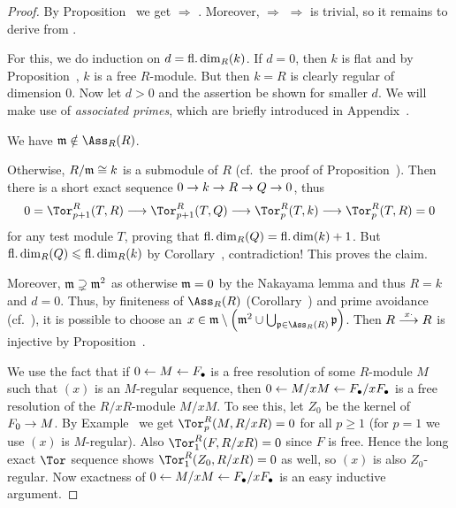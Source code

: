 \documentclass[a4paper,parskip=half,numbers=enddot, DIV=12]{scrreprt}
\renewcommand{\geq}{\geqslant}
\renewcommand{\leq}{\leqslant}
\begin{document}
\begin{proof}
	By Proposition~ we get  $\Rightarrow$ . Moreover,  $\Rightarrow$  $\Rightarrow$  is trivial, so it remains to derive  from .
	
	For this, we do induction on $d=\operatorname{fl.dim}_R(k)$. If $d=0$, then $k$ is flat and by Proposition~, $k$ is a free $R$-module. But then $k=R$ is clearly regular of dimension $0$. Now let $d>0$ and the assertion be shown for smaller $d$. We will make use of \emph{associated primes}, which are briefly introduced in Appendix~. 
	\begin{claim}
		We have $\mm\notin\Ass_R(R)$.
	\end{claim}
	Otherwise, $R/\mathfrak{m}\cong k$ is a submodule of $R$ (cf.\ the proof of Proposition~). Then there is a short exact sequence $0\morphism k\morphism R\morphism Q\morphism 0$, thus
	\begin{align*}
		0=\Tor_{p+1}^R(T,R)\morphism\Tor_{p+1}^R(T,Q)\morphism\Tor_p^R(T,k)\morphism\Tor_p^R(T,R)=0
	\end{align*}
	for any test module $T$, proving that $\operatorname{fl.dim}_R(Q)=\operatorname{fl.dim} (k)+1$. But $\fdim_R(Q)\leq\fdim_R(k)$ by Corollary~, contradiction! This proves the claim.
	
	Moreover, $\mathfrak{m}\supsetneq\mathfrak{m}^2$ as otherwise $\mathfrak{m}=0$ by the Nakayama lemma and thus $R=k$ and $d=0$. Thus, by finiteness of $\Ass_R(R)$ (Corollary~) and prime avoidance (cf.\ \cite[Lemma~2.5.1]{alg1}), it is possible to choose an $x\in\mm\setminus \left(\mm^2\cup\bigcup_{\pp\in\Ass_R(R)}\pp\right)$. Then $R\morphism[x\cdot]R$ is injective by Proposition~. 
	
	We use the fact that if $0\lmorphism M\lmorphism F_\bullet$ is a free resolution of some $R$-module $M$ such that $(x)$ is an $M$-regular sequence, then $0\lmorphism M/xM\lmorphism F_\bullet/xF_\bullet$ is a free resolution of the $R/xR$-module $M/xM$. To see this, let $Z_0$ be the kernel of $F_0\morphism M$. By Example~ we get $\Tor_p^R(M,R/xR)=0$ for all $p\geq 1$ (for $p=1$ we use $(x)$ is $M$-regular). Also $\Tor_1^R(F,R/xR)=0$ since $F$ is free. Hence the long exact $\Tor$ sequence shows $\Tor_1^R(Z_0,R/xR)=0$ as well, so $(x)$ is also $Z_0$-regular. Now exactness of $0\lmorphism M/xM\lmorphism F_\bullet/xF_\bullet$ is an easy inductive argument.
	

\end{proof}
\end{document}
